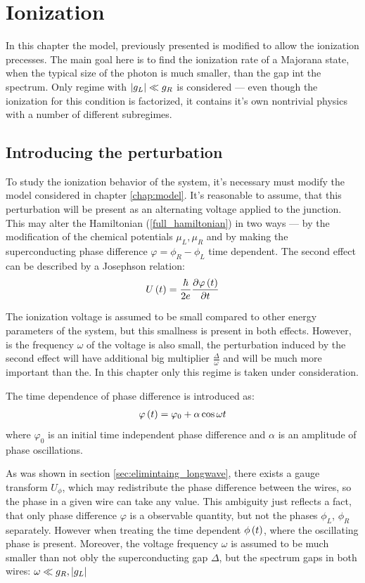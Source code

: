 \chapter{Ionization}

In this chapter the model, previously presented is modified to allow the ionization precesses. The main goal here is to find the ionization rate of a Majorana state, when the typical size of the photon is much smaller, than the gap int the spectrum.  Only regime with $ \left|g_L\right|\ll g_R $ is considered --- even though the ionization for this condition is factorized, it contains it's own nontrivial physics with a number of different subregimes.

\section{Introducing the perturbation}

To study the ionization behavior of the system, it's necessary must modify the model considered in chapter \ref{chap:model}. It's reasonable to assume, that this perturbation will be present as an alternating voltage applied to the junction. This may alter the Hamiltonian (\ref{full_hamiltonian}) in two ways --- by the modification of the chemical potentials $ \mu_L, \mu_R $ and by making the superconducting phase difference $ \varphi=\phi_R-\phi_L $ time dependent. The second effect can be described by a Josephson relation:
\begin{gather}
	U\left(t\right)
	=
	\frac{\hbar}{2e}
	\frac{\partial\varphi\left(t\right)}{\partial t}
\end{gather}

The ionization voltage is assumed to be small compared to other energy parameters of the system, but this smallness is present in both effects. However, is the frequency $ \omega $ of the voltage is also small, the perturbation induced by the second effect will have additional big multiplier $ \frac{\Delta}{\omega} $ and will be much more important than the. In this chapter only this regime is taken under consideration.

The time dependence of phase difference is introduced as:
\begin{gather}
	\varphi\left(t\right)=\varphi_0+\alpha\cos\omega t
\end{gather}
where $ \varphi_0 $ is an initial time independent phase difference and $ \alpha $ is an amplitude of phase oscillations.

As was shown in section \ref{sec:elimintaing_longwave}, there exists a gauge transform $ U_\phi $, which may redistribute the phase difference between the wires, so the phase in a given wire can take any value. This ambiguity just reflects a  fact, that only phase difference $ \varphi $ is a observable quantity, but not the phases $ \phi_L $, $ \phi_R $ separately. However when treating the time dependent $ \phi\left(t\right) $, where the oscillating phase is present. Moreover, the voltage frequency $ \omega $ is assumed to be much smaller than not obly the superconducting gap $ \Delta $, but the spectrum gaps in both wires: $ \omega\ll g_R, \left|g_L\right| $


